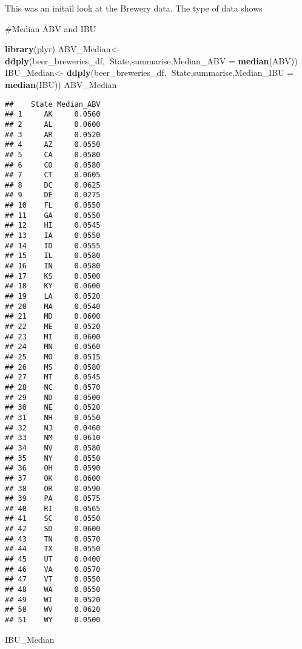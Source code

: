 \documentclass[
]{article}
\newenvironment{Shaded}{\begin{snugshade}}{\end{snugshade}}
\newcommand{\DataTypeTok}[1]{\textcolor[rgb]{0.13,0.29,0.53}{#1}}
\newcommand{\KeywordTok}[1]{\textcolor[rgb]{0.13,0.29,0.53}{\textbf{#1}}}
\newcommand{\NormalTok}[1]{#1}
\newcommand{\OperatorTok}[1]{\textcolor[rgb]{0.81,0.36,0.00}{\textbf{#1}}}
\newcommand{\StringTok}[1]{\textcolor[rgb]{0.31,0.60,0.02}{#1}}
\begin{document}
This was an initail look at the Brewery data. The type of data shows

\#Median ABV and IBU

\begin{Shaded}
\begin{Highlighting}[]
\KeywordTok{library}\NormalTok{(plyr)}
\NormalTok{ABV_Median<-}\StringTok{ }\KeywordTok{ddply}\NormalTok{(beer_breweries_df,}\OperatorTok{~}\NormalTok{State,summarise,}\DataTypeTok{Median_ABV =} \KeywordTok{median}\NormalTok{(ABV))}
\NormalTok{IBU_Median<-}\StringTok{ }\KeywordTok{ddply}\NormalTok{(beer_breweries_df,}\OperatorTok{~}\NormalTok{State,summarise,}\DataTypeTok{Median_IBU =} \KeywordTok{median}\NormalTok{(IBU))}
\NormalTok{ABV_Median}
\end{Highlighting}
\end{Shaded}

\begin{verbatim}
##    State Median_ABV
## 1     AK     0.0560
## 2     AL     0.0600
## 3     AR     0.0520
## 4     AZ     0.0550
## 5     CA     0.0580
## 6     CO     0.0580
## 7     CT     0.0605
## 8     DC     0.0625
## 9     DE     0.0275
## 10    FL     0.0550
## 11    GA     0.0550
## 12    HI     0.0545
## 13    IA     0.0550
## 14    ID     0.0555
## 15    IL     0.0580
## 16    IN     0.0580
## 17    KS     0.0500
## 18    KY     0.0600
## 19    LA     0.0520
## 20    MA     0.0540
## 21    MD     0.0600
## 22    ME     0.0520
## 23    MI     0.0600
## 24    MN     0.0560
## 25    MO     0.0515
## 26    MS     0.0580
## 27    MT     0.0545
## 28    NC     0.0570
## 29    ND     0.0500
## 30    NE     0.0520
## 31    NH     0.0550
## 32    NJ     0.0460
## 33    NM     0.0610
## 34    NV     0.0580
## 35    NY     0.0550
## 36    OH     0.0590
## 37    OK     0.0600
## 38    OR     0.0590
## 39    PA     0.0575
## 40    RI     0.0565
## 41    SC     0.0550
## 42    SD     0.0600
## 43    TN     0.0570
## 44    TX     0.0550
## 45    UT     0.0400
## 46    VA     0.0570
## 47    VT     0.0550
## 48    WA     0.0550
## 49    WI     0.0520
## 50    WV     0.0620
## 51    WY     0.0500
\end{verbatim}

\begin{Shaded}
\begin{Highlighting}[]
\NormalTok{IBU_Median}
\end{Highlighting}
\end{Shaded}
\end{document}
